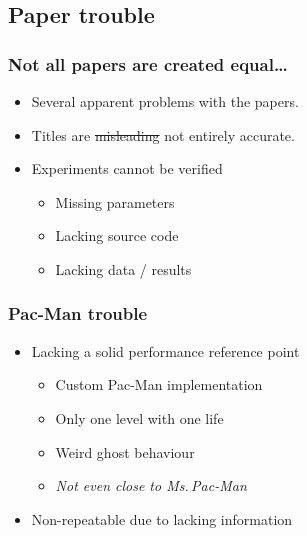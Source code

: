 \documentclass{beamer}
\begin{document}
\subsection{Paper trouble}
\begin{frame}
\frametitle{Not all papers are created equal\dots}
\begin{itemize}
\item Several apparent problems with the papers.
\item Titles are \sout{misleading} not entirely accurate.
\item Experiments cannot be verified
\begin{itemize}
\item Missing parameters
\item Lacking source code
\item Lacking data / results
\end{itemize}
\end{itemize}
\end{frame}

\begin{frame}
\frametitle{Pac-Man trouble}
\begin{itemize}
\item Lacking a solid performance reference point
\begin{itemize}
\item Custom Pac-Man implementation
\item Only one level with one life
\item Weird ghost behaviour
\item \textit{Not even close to Ms.\,Pac-Man}
\end{itemize}
\item Non-repeatable due to lacking information
\end{itemize}
\end{frame}
\end{document}
